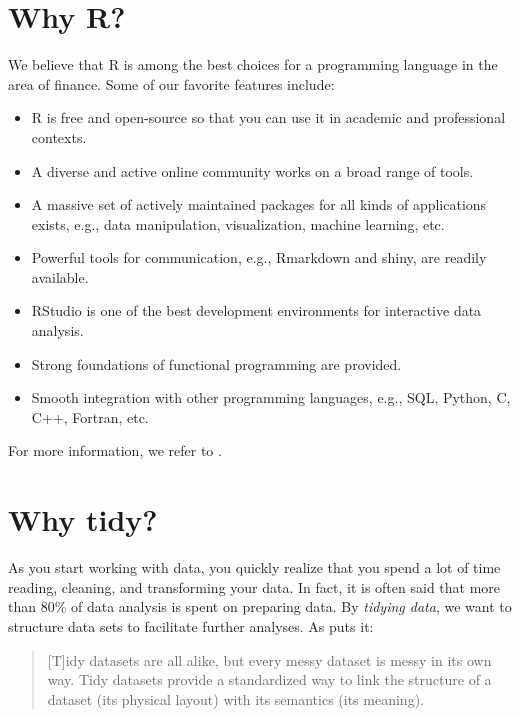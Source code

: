 \documentclass[
]{krantz}
\providecommand{\tightlist}{%
  \setlength{\itemsep}{0pt}\setlength{\parskip}{0pt}}
\begin{document}
\hypertarget{why-r}{%
\section*{Why R?}\label{why-r}}


We believe that R is among the best choices for a programming language in the area of finance. Some of our favorite features include:

\begin{itemize}
\tightlist
\item
  R is free and open-source so that you can use it in academic and professional contexts.
\item
  A diverse and active online community works on a broad range of tools.
\item
  A massive set of actively maintained packages for all kinds of applications exists, e.g., data manipulation, visualization, machine learning, etc.
\item
  Powerful tools for communication, e.g., Rmarkdown and shiny, are readily available.
\item
  RStudio is one of the best development environments for interactive data analysis.
\item
  Strong foundations of functional programming are provided.
\item
  Smooth integration with other programming languages, e.g., SQL, Python, C, C++, Fortran, etc.
\end{itemize}

For more information, we refer to \citet{Wickham2019}.

\hypertarget{why-tidy}{%
\section*{Why tidy?}\label{why-tidy}}


As you start working with data, you quickly realize that you spend a lot of time reading, cleaning, and transforming your data. In fact, it is often said that more than 80\% of data analysis is spent on preparing data. By \emph{tidying data}, we want to structure data sets to facilitate further analyses. As \citet{Wickham2014} puts it:

\begin{quote}
{[}T{]}idy datasets are all alike, but every messy dataset is messy in its own way. Tidy datasets provide a standardized way to link the structure of a dataset (its physical layout) with its semantics (its meaning).
\end{quote}
\end{document}
